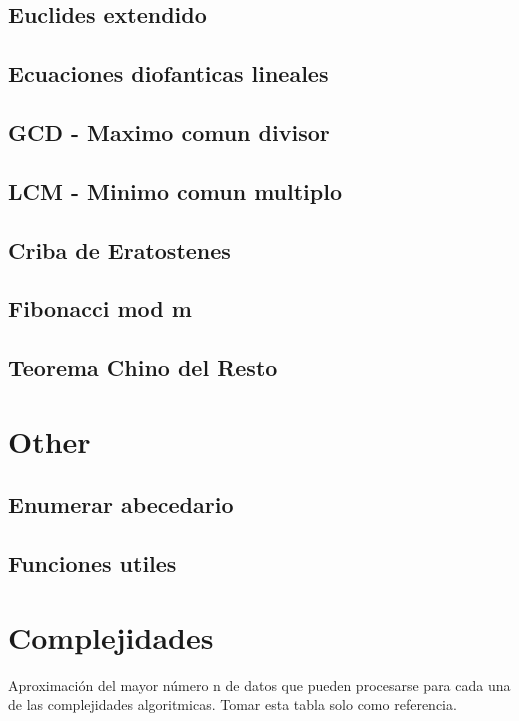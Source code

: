 \subsection{Euclides extendido}
\subsection{Ecuaciones diofanticas lineales}
\subsection{GCD - Maximo comun divisor}
\subsection{LCM - Minimo comun multiplo}
\subsection{Criba de Eratostenes}
\subsection{Fibonacci mod m}
\subsection{Teorema Chino del Resto}

\section{Other}
\subsection{Enumerar abecedario}
\subsection{Funciones utiles}


\section{Complejidades}
Aproximación del mayor número n de datos que pueden procesarse para cada una de las complejidades algoritmicas. Tomar esta tabla solo como referencia.

